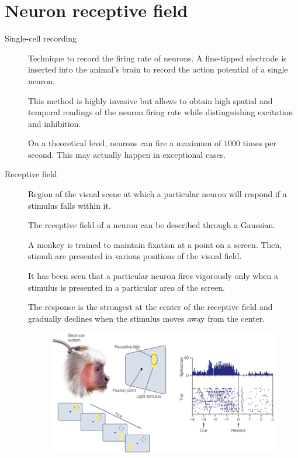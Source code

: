 \section{Neuron receptive field}
\begin{description}
    \item[Single-cell recording] 
        Technique to record the firing rate of neurons.
        A fine-tipped electrode is inserted into the animal's brain to record the action potential of a single neuron.
        
        This method is highly invasive but allows to obtain high spatial and temporal readings of the neuron firing rate while distinguishing excitation and inhibition.

        \begin{remark}
            On a theoretical level, neurons can fire a maximum of $1000$ times per second.
            This may actually happen in exceptional cases.
        \end{remark}

    
    \item[Receptive field] 
        Region of the visual scene at which a particular neuron will respond if a stimulus falls within it. 

        \begin{remark}
            The receptive field of a neuron can be described through a Gaussian.
        \end{remark}

        \begin{casestudy}
            A monkey is trained to maintain fixation at a point on a screen.
            Then, stimuli are presented in various positions of the visual field.

            It has been seen that a particular neuron fires vigorously only when a stimulus is presented in a particular area of the screen.

            The response is the strongest at the center of the receptive field and gradually declines when the stimulus moves away from the center.

            \begin{figure}[H]
                \centering
                \includegraphics[width=0.55\linewidth]{./img/receptive_field_monkey.png}
            \end{figure}
        \end{casestudy}


\end{description}
